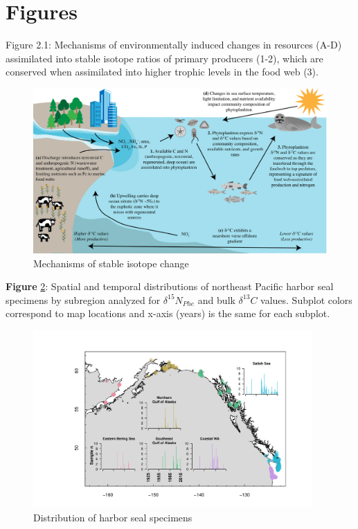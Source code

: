 \documentclass [11pt, proquest] {uwthesis}[2015/03/03]
\begin{document}
\section{Figures}\label{figures-1}
\begin{landscape}

Figure 2.1: Mechanisms of environmentally induced changes in resources (A-D) assimilated into stable isotope ratios of primary producers (1-2), which are conserved when assimilated into higher trophic levels in the food web (3).\newline 
\begin{figure}[h]
\centering
  \includegraphics[width=1.1\textwidth]{figure/Ch2/Figure1.pdf}
  \caption{Mechanisms of stable isotope change}
  \label{fig:theo}
\end{figure}
\end{landscape}
\clearpage

\textbf{Figure} \ref{fig:map}: Spatial and temporal distributions of
northeast Pacific harbor seal specimens by subregion analyzed for
\(\delta^{15}N_{Phe}\) and bulk \(\delta^{13}C\) values. Subplot colors
correspond to map locations and x-axis (years) is the same for each
subplot.\newline 
\begin{figure}[h]
\centering
  \includegraphics[width=0.95\textwidth]{figure/Ch2/Fig2_Map.pdf}
  \caption{Distribution of harbor seal specimens}
  \label{fig:map}
\end{figure}
\clearpage
\end{document}
